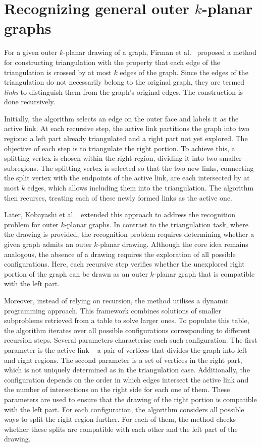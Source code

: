 \section{Recognizing general outer \(k\)-planar graphs}\label{sec:recognizing-general-outer-(k)-planar-graphs}

For a given outer \(k\)-planar drawing of a graph, Firman et al.~\cite{triangulations} proposed a method for constructing triangulation with the property that each edge of the triangulation is crossed by at most \(k\) edges of the graph. Since the edges of the triangulation do not necessarily belong to the original graph, they are termed \emph{links} to distinguish them from the graph’s original edges. The construction is done recursively.

Initially, the algorithm selects an edge on the outer face and labels it as the active link. At each recursive step, the active link partitions the graph into two regions: a left part already triangulated and a right part not yet explored. The objective of each step is to triangulate the right portion. To achieve this, a splitting vertex is chosen within the right region, dividing it into two smaller subregions. The splitting vertex is selected so that the two new links, connecting the split vertex with the endpoints of the active link, are each intersected by at most \(k\) edges, which allows including them into the triangulation. The algorithm then recurses, treating each of these newly formed links as the active one.

Later, Kobayashi et al.~\cite{okp} extended this approach to address the recognition problem for outer \(k\)-planar graphs. In contrast to the triangulation task, where the drawing is provided, the recognition problem requires determining whether a given graph admits an outer \(k\)-planar drawing. Although the core idea remains analogous, the absence of a drawing requires the exploration of all possible configurations. Here, each recursive step verifies whether the unexplored right portion of the graph can be drawn as an outer \(k\)-planar graph that is compatible with the left part.

Moreover, instead of relying on recursion, the method utilises a dynamic programming approach. This framework combines solutions of smaller subproblems retrieved from a table to solve larger ones. To populate this table, the algorithm iterates over all possible configurations corresponding to different recursion steps. Several parameters characterise each such configuration. The first parameter is the active link -- a pair of vertices that divides the graph into left and right regions. The second parameter is a set of vertices in the right part, which is not uniquely determined as in the triangulation case. Additionally, the configuration depends on the order in which edges intersect the active link and the number of intersections on the right side for each one of them. These parameters are used to ensure that the drawing of the right portion is compatible with the left part. For each configuration, the algorithm considers all possible ways to split the right region further. For each of them, the method checks whether these splits are compatible with each other and the left part of the drawing.

